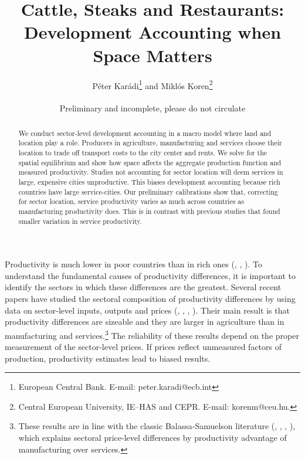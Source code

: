 \documentclass[12pt]{article}
\begin{document}
\title{Cattle, Steaks and Restaurants:\\ Development Accounting when Space Matters}
\author{Péter Karádi\thanks{European Central Bank. E-mail: peter.karadi@ecb.int} and Miklós Koren\thanks{Central European University, IE--HAS and CEPR. E-mail: korenm@ceu.hu.}\\
\\
Preliminary and incomplete, please do not circulate}
\maketitle

\begin{abstract}
We conduct sector-level development accounting in a macro model where land and location play a role. Producers in agriculture, manufacturing and services choose their location to trade off transport costs to the city center and rents. We solve for the spatial equilibrium and show how space affects the aggregate production function and measured productivity. Studies not accounting for sector location will deem services in large, expensive cities unproductive. This biases development accounting because rich countries have large service-cities. Our preliminary calibrations show that, correcting for sector location, service productivity varies as much across countries as manufacturing productivity does. This is in contrast with previous studies that found smaller variation in service productivity.
\end{abstract}

Productivity is much lower in poor countries than in rich ones (, , ). To understand the fundamental causes of productivity differences, it is important to identify the sectors in which these differences are the greatest. Several recent papers have studied the sectoral composition of productivity differences by using data on sector-level inputs, outputs and prices (, , , ). Their main result is that productivity differences are sizeable and they are larger in agriculture than in manufacturing and services.\footnote{These results are in line with the classic Balassa-Samuelson literature (, , , ), which explains sectoral price-level differences by productivity advantage of manufacturing over services.} %
The reliability of these results depend on the proper measurement of the sector-level prices. If prices reflect unmeasured factors of production, productivity estimates lead to biased results.
\end{document}
